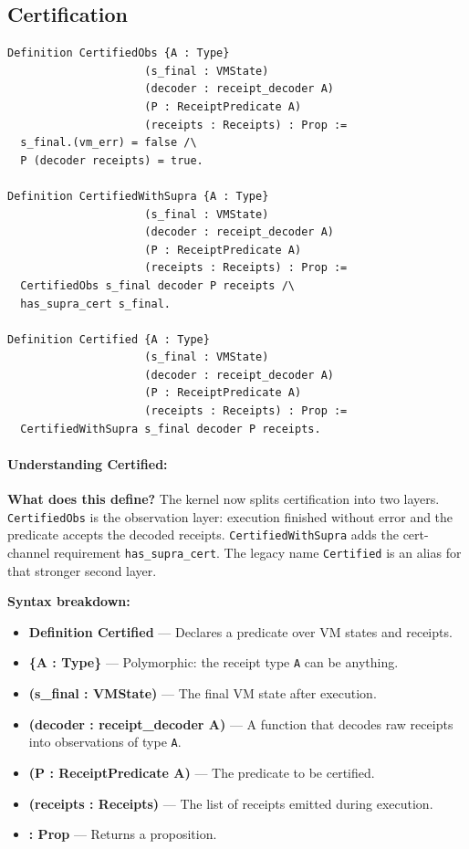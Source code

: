 \subsection{Certification}

\begin{lstlisting}
Definition CertifiedObs {A : Type}
                     (s_final : VMState)
                     (decoder : receipt_decoder A)
                     (P : ReceiptPredicate A)
                     (receipts : Receipts) : Prop :=
  s_final.(vm_err) = false /\
  P (decoder receipts) = true.

Definition CertifiedWithSupra {A : Type}
                     (s_final : VMState)
                     (decoder : receipt_decoder A)
                     (P : ReceiptPredicate A)
                     (receipts : Receipts) : Prop :=
  CertifiedObs s_final decoder P receipts /\
  has_supra_cert s_final.

Definition Certified {A : Type}
                     (s_final : VMState)
                     (decoder : receipt_decoder A)
                     (P : ReceiptPredicate A)
                     (receipts : Receipts) : Prop :=
  CertifiedWithSupra s_final decoder P receipts.
\end{lstlisting}

\paragraph{Understanding Certified:}

\textbf{What does this define?} The kernel now splits certification into two layers. \texttt{CertifiedObs} is the observation layer: execution finished without error and the predicate accepts the decoded receipts. \texttt{CertifiedWithSupra} adds the cert-channel requirement \texttt{has\_supra\_cert}. The legacy name \texttt{Certified} is an alias for that stronger second layer.

\textbf{Syntax breakdown:}
\begin{itemize}
    \item \textbf{Definition Certified} — Declares a predicate over VM states and receipts.
    \item \textbf{\{A : Type\}} — Polymorphic: the receipt type \texttt{A} can be anything.
    \item \textbf{(s\_final : VMState)} — The final VM state after execution.
    \item \textbf{(decoder : receipt\_decoder A)} — A function that decodes raw receipts into observations of type \texttt{A}.
    \item \textbf{(P : ReceiptPredicate A)} — The predicate to be certified.
    \item \textbf{(receipts : Receipts)} — The list of receipts emitted during execution.
    \item \textbf{: Prop} — Returns a proposition.
\end{itemize}

